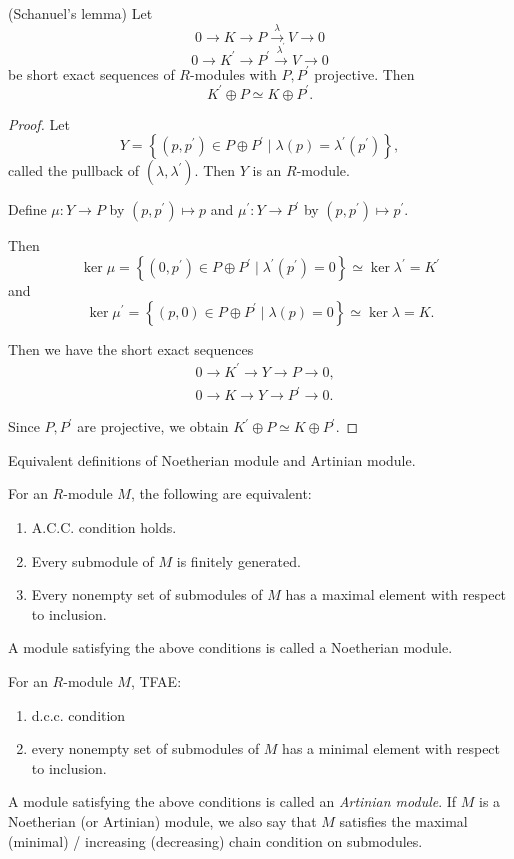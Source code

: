 \documentclass[11pt, a4paper]{report}
\begin{document}
\begin{theorem}
(Schanuel's lemma)
Let
\[
0 \rightarrow K \rightarrow P \xrightarrow{\lambda} V \rightarrow 0
\]
\[
0 \rightarrow K^{\prime} \rightarrow P^{\prime} \xrightarrow{\lambda^{\prime}} V \rightarrow 0
\]
be short exact sequences of $R$-modules with $P, P^{\prime}$ projective. Then
\[
K^{\prime} \oplus P \simeq K \oplus P^{\prime}.
\]
\end{theorem}

\begin{proof}
Let
\[
Y=\left\{\left(p, p^{\prime}\right) \in P \oplus P^{\prime} \mid \lambda(p)=\lambda^{\prime}\left(p^{\prime}\right)\right\},
\]
called the pullback of $\left(\lambda, \lambda^{\prime}\right)$. Then $Y$ is an $R$-module.

Define $\mu: Y \rightarrow P$ by $\left(p, p^{\prime}\right) \mapsto p$ and $\mu^{\prime}: Y \rightarrow P^{\prime}$ by $\left(p, p^{\prime}\right) \mapsto p^{\prime}$.

Then
\[
\ker \mu=\left\{\left(0, p^{\prime}\right) \in P \oplus P^{\prime} \mid \lambda^{\prime}\left(p^{\prime}\right)=0\right\} \simeq \ker \lambda^{\prime}=K^{\prime}
\]
and
\[
\ker \mu^{\prime}=\left\{(p, 0) \in P \oplus P^{\prime} \mid \lambda(p)=0\right\} \simeq \ker \lambda=K.
\]

Then we have the short exact sequences
\[
\begin{aligned}
& 0 \rightarrow K^{\prime} \rightarrow Y \rightarrow P \rightarrow 0, \\
& 0 \rightarrow K \rightarrow Y \rightarrow P^{\prime} \rightarrow 0.
\end{aligned}
\]

Since $P, P^{\prime}$ are projective, we obtain $K^{\prime} \oplus P \simeq K \oplus P^{\prime}$.

\end{proof}

\begin{proposition}
Equivalent definitions of Noetherian module and Artinian module.

For an $R$-module $M$, the following are equivalent:
\begin{enumerate}
\item A.C.C. condition holds.
\item Every submodule of $M$ is finitely generated.
\item Every nonempty set of submodules of $M$ has a maximal element with respect to inclusion.
\end{enumerate}
A module satisfying the above conditions is called a Noetherian module.
\end{proposition}
For an $R$-module $M$, TFAE:
\begin{enumerate}
\item[(1)] d.c.c. condition
\item[(2)] every nonempty set of submodules of $M$ has a minimal element with respect to inclusion.
\end{enumerate}
A module satisfying the above conditions is called an \emph{Artinian module}. If $M$ is a Noetherian (or Artinian) module, we also say that $M$ satisfies the maximal (minimal) / increasing (decreasing) chain condition on submodules.
\end{document}
